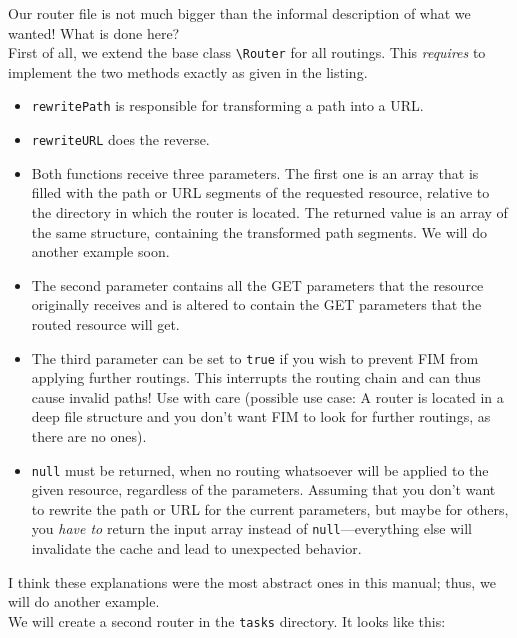 \documentclass{scrartcl}
\begin{document}
      \begin{listing}[H]
         \caption{Our routing, \texttt{/fim.router.php}}
      \end{listing}
      Our router file is not much bigger than the informal description of what we wanted! What is done here? \\
      First of all, we extend the base class \lstinline!\Router! for all routings. This \emph{requires} to implement the two methods exactly as given in the listing.
      \begin{itemize}
         \item
            \lstinline!rewritePath! is responsible for transforming a path into a URL.
         \item
            \lstinline!rewriteURL! does the reverse.
         \item
            Both functions receive three parameters. The first one is an array that is filled with the path or URL segments of the requested resource, relative to the directory in which the router is located. The returned value is an array of the same structure, containing the transformed path segments. We will do another example soon.
         \item
            The second parameter contains all the GET parameters that the resource originally receives and is altered to contain the GET parameters that the routed resource will get.
         \item
            The third parameter can be set to \lstinline!true! if you wish to prevent FIM from applying further routings. This interrupts the routing chain and can thus cause invalid paths! Use with care (possible use case: A router is located in a deep file structure and you don't want FIM to look for further routings, as there are no ones).
         \item
            \lstinline!null! must be returned, when no routing whatsoever will be applied to the given resource, regardless of the parameters. Assuming that you don't want to rewrite the path or URL for the current parameters, but maybe for others, you \emph{have to} return the input array instead of \lstinline!null!---everything else will invalidate the cache and lead to unexpected behavior.
      \end{itemize}
      I think these explanations were the most abstract ones in this manual; thus, we will do another example. \\
      We will create a second router in the \texttt{tasks} directory. It looks like this:
\end{document}
